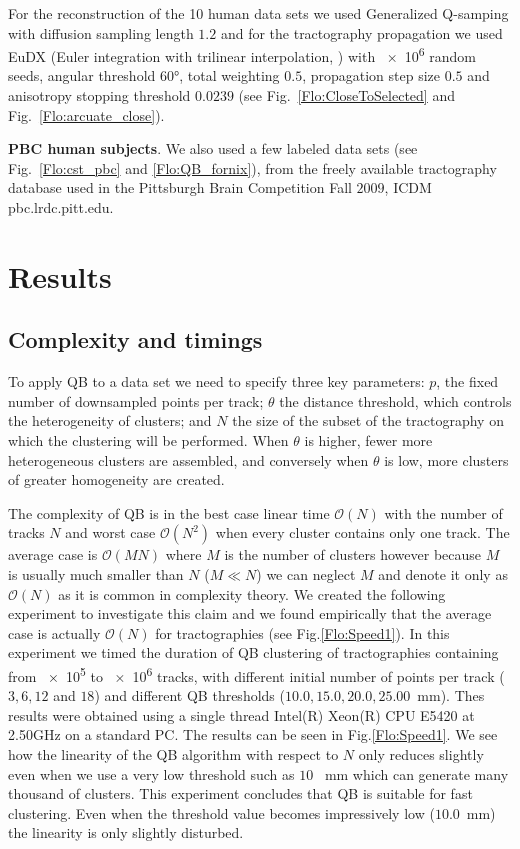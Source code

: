 \documentclass[preprint,authoryear,a4paper,10pt,onecolumn]{elsarticle}
\begin{document}
For the reconstruction of the 10 human data sets we used Generalized
Q-samping \citep{Yeh2010} with diffusion sampling length $1.2$ and for
the tractography propagation we used EuDX (Euler integration with
trilinear interpolation, \citet{Garyfallidis_thesis}) with \num{e6}
random seeds, angular threshold \ang{60}, total weighting $0.5$,
propagation step size $0.5$ and anisotropy stopping threshold $0.0239$
(see Fig.~\ref{Flo:CloseToSelected} and Fig.~\ref{Flo:arcuate_close}).

\textbf{PBC human subjects}. We also used a few labeled data sets (see
Fig.~\ref{Flo:cst_pbc} and \ref{Flo:QB_fornix}), from the freely available
tractography database used in the Pittsburgh Brain Competition Fall
$2009$, ICDM pbc.lrdc.pitt.edu.

\section{Results}

\subsection{Complexity and timings\label{sub:Complexity}}

To apply QB to a data set we need to specify three key parameters:
$p$, the fixed number of downsampled points per track; $\theta$
the distance threshold, which controls the heterogeneity of clusters;
and $N$ the size of the subset of the tractography on which the clustering
will be performed. When $\theta$ is higher, fewer more heterogeneous
clusters are assembled, and conversely when $\theta$ is low, more
clusters of greater homogeneity are created.

The complexity of QB is in the best case linear time $\mathcal{O}(N)$
with the number of tracks $N$ and worst case $\mathcal{O}(N^{2})$ when
every cluster contains only one track. The average case is
$\mathcal{O}(MN)$ where $M$ is the number of clusters however because
$M$ is usually much smaller than $N$ ($M\ll N$) we can neglect $M$ and
denote it only as $\mathcal{O}(N)$ as it is common in complexity
theory. We created the following experiment to investigate this claim
and we found empirically that the average case is actually
$\mathcal{O}(N)$ for tractographies (see Fig.\ref{Flo:Speed1}).  In this
experiment we timed the duration of QB clustering of tractographies
containing from \num{e5} to \num{e6} tracks, with different initial
number of points per track ($3,6,12$ and $18$) and different QB
thresholds ($10.0,15.0,20.0,25.00$~mm). Thes results were obtained using
a single thread Intel(R) Xeon(R) CPU E5420 at 2.50GHz on a standard
PC. The results can be seen in Fig.\ref{Flo:Speed1}. We see how the
linearity of the QB algorithm with respect to $N$ only reduces slightly
even when we use a very low threshold such as $10$ ~mm which can
generate many thousand of clusters. This experiment concludes that QB is
suitable for fast clustering. Even when the threshold value becomes
impressively low ($10.0$~mm) the linearity is only slightly disturbed.
\end{document}
